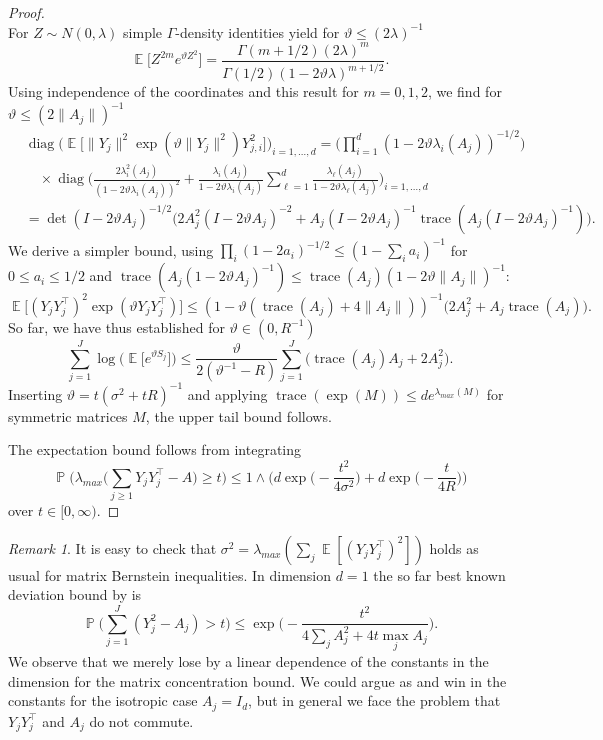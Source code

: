 \documentclass[preprint,aos]{imsart}
\numberwithin{equation}{section}
\theoremstyle{remark}
\newtheorem{remark}[satz]{Remark}
\DeclareMathOperator{\E}{{\mathbb E}}
\DeclareMathOperator{\PP}{{\mathbb P}}
\DeclareMathOperator{\trace}{trace}
\DeclareMathOperator{\diag}{diag} \DeclareMathOperator{\KL}{KL}
\renewcommand{\theta}{\vartheta}
\providecommand{\norm}[1]{\lVert #1 \rVert}
\renewcommand{\le}{\leqslant}
\renewcommand{\ge}{\geqslant}
\begin{document}
\begin{appendix}
\begin{proof}
\[\]
For $Z\sim N(0,\lambda)$ simple $\Gamma$-density identities yield for $\theta\le (2\lambda)^{-1}$
\[ \E\big[Z^{2m}e^{\theta Z^2}]=\frac{\Gamma(m+1/2)(2\lambda)^m}{\Gamma(1/2)(1-2\theta\lambda)^{m+1/2}}.\]
Using independence of the coordinates and this result for $m=0,1,2$, we find for $\theta\le (2\norm{A_j})^{-1}$
\begin{align*}
&\diag\Big(\E\big[\norm{Y_j}^2\exp(\theta \norm{Y_j}^2)Y_{j,i}^2\big]\Big)_{i=1,\ldots,d} =\Big(\prod_{i=1}^d(1-2\theta\lambda_i(A_j))^{-1/2}\Big) \\ &\quad\times\diag\Big(\frac{2\lambda_i^2(A_j)}{(1-2\theta\lambda_i(A_j))^2}
+\frac{\lambda_i(A_j)}{1-2\theta\lambda_i(A_j)}\sum_{\ell=1}^d\frac{\lambda_\ell(A_j)}{1-2\theta\lambda_\ell(A_j)}\Big)_{i=1,\ldots,d}\\
&=\det(I-2\theta A_j)^{-1/2}\Big(2A_j^2(I-2\theta A_j)^{-2}
+A_j(I-2\theta A_j)^{-1}\trace(A_j(I-2\theta A_j)^{-1})\Big).
\end{align*}
We derive a simpler bound, using $\prod_i(1-2a_i)^{-1/2}\le (1-\sum_ia_i)^{-1}$ for $0\le a_i\le 1/2$ and $\trace(A_j(1-2\theta A_j)^{-1})\le \trace(A_j)(1-2\theta\norm{A_j})^{-1}$:
\[ \E\big[(Y_jY_j^\top)^2\exp(\theta Y_jY_j^\top)\big]\le (1-\theta(\trace(A_j)+4\norm{A_j}))^{-1}\big(2A_j^2+A_j\trace(A_j)\big).\]
So far, we have thus established for $\theta\in(0,R^{-1})$
\[ \sum_{j=1}^J \log\big(\E\big[e^{\theta S_j}\big]\big)\le \frac{\theta}{2(\theta^{-1}-R)} \sum_{j=1}^J\big(\trace(A_j) A_j+2A_j^2\big).
\]
Inserting $\theta=t(\sigma^2+tR)^{-1}$ and applying $\trace(\exp(M))\le de^{\lambda_{max}(M)}$ for symmetric matrices $M$, the upper tail bound follows.


The expectation bound follows from integrating
\[\PP\Big(\lambda_{max}\Big(\sum_{j\ge 1} Y_jY_j^\top-A\Big)\ge t\Big)\le 1\wedge\Big(d\exp\Big(-\frac{t^2}{4\sigma^2}\Big)+ d\exp\Big(-\frac{t}{4R}\Big)\Big)
\]
over $t\in[0,\infty)$.
\end{proof}

\begin{remark}
It is easy to check that $\sigma^2=\lambda_{max}(\sum_j\E[(Y_jY_j^\top)^2])$ holds as usual for matrix Bernstein inequalities.
 In dimension $d=1$ the so far best known deviation bound by \citet{laurent2000} is
\[ \PP\Big(\sum_{j= 1}^J (Y_j^2-A_j)>t\Big)\le \exp\Big(-\frac{t^2}{4\sum_{j}A_j^2+4t\max_{j}A_j}\Big).\]
We observe that we merely lose by a linear dependence of the constants in the dimension for the matrix concentration bound. We could argue as \citet{laurent2000} and win in the constants for the isotropic case $A_j=I_d$, but in general we face the problem that $Y_jY_j^\top$ and $A_j$ do not commute.
\end{remark}


\end{appendix}
\end{document}
